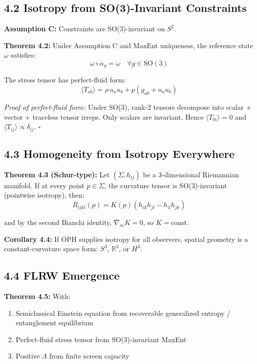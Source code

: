 \subsection{4.2 Isotropy from SO(3)-Invariant Constraints}\label{42-isotropy-from-so3-invariant-constraints}

\textbf{Assumption C:} Constraints are SO(3)-invariant on \(S^2\).

\textbf{Theorem 4.2:} Under Assumption C and MaxEnt uniqueness, the reference state \(\omega\) satisfies: \[\omega \circ \alpha_g = \omega \quad \forall g \in \text{SO}(3)\]

The stress tensor has perfect-fluid form: \[\langle T_{ab} \rangle = \rho \, u_a u_b + p(g_{ab} + u_a u_b)\]

\emph{Proof of perfect-fluid form:} Under SO(3), rank-2 tensors decompose into scalar + vector + traceless tensor irreps. Only scalars are invariant. Hence \(\langle T_{0i} \rangle = 0\) and \(\langle T_{ij} \rangle \propto \delta_{ij}\). \(\square\)

\subsection{4.3 Homogeneity from Isotropy Everywhere}\label{43-homogeneity-from-isotropy-everywhere}

\textbf{Theorem 4.3 (Schur-type):} Let \((\Sigma, h_{ij})\) be a 3-dimensional Riemannian manifold. If at every point \(p \in \Sigma\), the curvature tensor is SO(3)-invariant (pointwise isotropy), then: \[R_{ijkl}(p) = K(p)(h_{ik}h_{jl} - h_{il}h_{jk})\]

and by the second Bianchi identity, \(\nabla_m K = 0\), so \(K = \text{const}\).

\textbf{Corollary 4.4:} If OPH supplies isotropy for all observers, spatial geometry is a constant-curvature space form: \(S^3\), \(\mathbb{R}^3\), or \(H^3\).

\subsection{4.4 FLRW Emergence}\label{44-flrw-emergence}

\textbf{Theorem 4.5:} With:

\begin{enumerate}
\def\labelenumi{\arabic{enumi}.}
\tightlist
\item
  Semiclassical Einstein equation from recoverable generalized entropy / entanglement equilibrium
\item
  Perfect-fluid stress tensor from SO(3)-invariant MaxEnt
\item
  Positive \(\Lambda\) from finite screen capacity
\end{enumerate}

